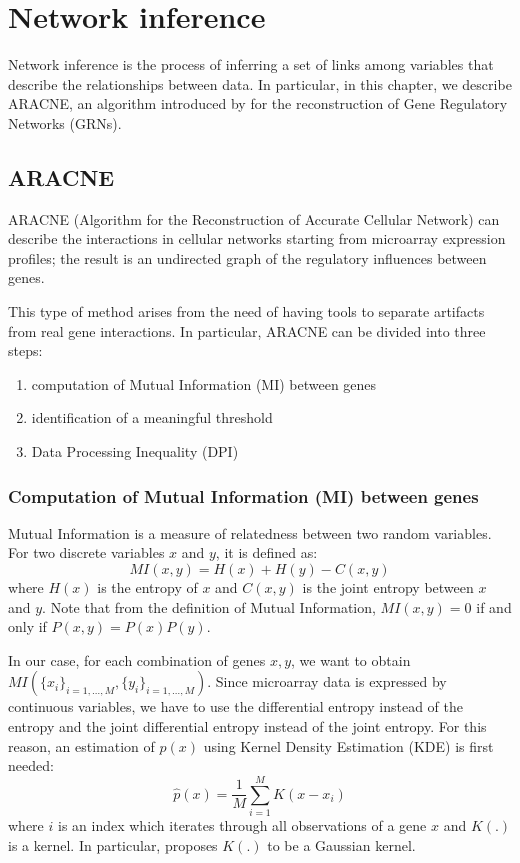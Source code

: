 \chapter{Network inference}

Network inference is the process of inferring a set of links among variables
that describe the relationships between data.
In particular, in this chapter, we describe ARACNE, an algorithm introduced by \cite{DBLP:journals/bmcbi/MargolinNBWSFC06}
for the reconstruction of Gene Regulatory Networks (GRNs).

\section{ARACNE}
ARACNE (Algorithm for the Reconstruction of Accurate Cellular Network)
can describe the interactions in cellular networks
starting from microarray expression profiles;
the result is an undirected graph of the regulatory influences between genes.

This type of method arises from the need of having tools to separate artifacts
from real gene interactions.
In particular, ARACNE can be divided into three steps:
\begin{enumerate}
    \item computation of Mutual Information (MI) between genes
    \item identification of a meaningful threshold
    \item Data Processing Inequality (DPI)
\end{enumerate}

\subsection{Computation of Mutual Information (MI) between genes} \label{MI}
Mutual Information is a measure of relatedness between two random variables.
For two discrete variables $x$ and $y$, it is defined as:
\[ \mathit{MI}(x, y) = H(x) + H(y) - C(x, y) \]
where $H(x)$ is the entropy of $x$ and $C(x, y)$ is the joint entropy between $x$ and $y$.
Note that from the definition of Mutual Information,
$\mathit{MI}(x, y) = 0$
if and only if $P(x, y) = P(x) P(y)$.

In our case, for each combination of genes $x, y$,
we want to obtain $\mathit{MI}(\{ x_i \}_{i=1,\dots,M}, \{ y_i \}_{i=1,\dots,M})$.
Since microarray data is expressed by continuous variables,
we have to use the differential entropy instead of the entropy
and the joint differential entropy instead of the joint entropy.
For this reason, an estimation of $p(x)$
using Kernel Density Estimation (KDE) is first needed:
\[ \hat{p}(x) = \frac{1}{M} \sum_{i=1}^{M} K(x - x_i) \]
where $i$ is an index which iterates through all observations of a gene $x$
and $K(.)$ is a kernel.
In particular, \cite{DBLP:journals/bmcbi/MargolinNBWSFC06} proposes
$K(.)$ to be a Gaussian kernel.

